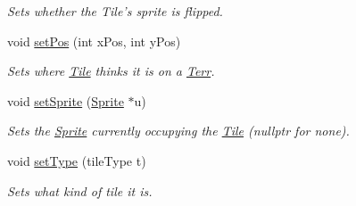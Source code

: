 \begin{DoxyCompactItemize}
\begin{DoxyCompactList}\small\item\em Sets whether the Tile’s sprite is flipped. \end{DoxyCompactList}\item 
void \hyperlink{class_tile_a8a6429d2adbe3e45c519d86a57b514c3}{set\+Pos} (int x\+Pos, int y\+Pos)\hypertarget{class_tile_a8a6429d2adbe3e45c519d86a57b514c3}{}\label{class_tile_a8a6429d2adbe3e45c519d86a57b514c3}

\begin{DoxyCompactList}\small\item\em Sets where \hyperlink{class_tile}{Tile} thinks it is on a \hyperlink{class_terr}{Terr}. \end{DoxyCompactList}\item 
void \hyperlink{class_tile_ad85c92ea426639130cc1d0d38641da3c}{set\+Sprite} (\hyperlink{class_sprite}{Sprite} $\ast$u)\hypertarget{class_tile_ad85c92ea426639130cc1d0d38641da3c}{}\label{class_tile_ad85c92ea426639130cc1d0d38641da3c}

\begin{DoxyCompactList}\small\item\em Sets the \hyperlink{class_sprite}{Sprite} currently occupying the \hyperlink{class_tile}{Tile} (nullptr for none). \end{DoxyCompactList}\item 
void \hyperlink{class_tile_a2557595d030a43cf9b5334df3b7264f7}{set\+Type} (tile\+Type t)\hypertarget{class_tile_a2557595d030a43cf9b5334df3b7264f7}{}\label{class_tile_a2557595d030a43cf9b5334df3b7264f7}

\begin{DoxyCompactList}\small\item\em Sets what kind of tile it is. \end{DoxyCompactList}\end{DoxyCompactItemize}
